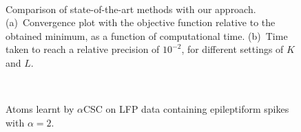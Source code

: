 \begin{figure}[t]
    \centering
      \\
    \caption[]{Comparison of state-of-the-art methods with our approach. (a)~Convergence plot with the objective function relative to the obtained minimum, as a function of computational time. (b)~Time taken to reach a relative precision of $10^{-2}$, for different settings of $K$ and $L$.  }
    \label{fig:sommaire:convergence}
\end{figure}

\begin{figure}[b]
    \centering
              \\

            \caption[]{Atoms learnt by $\alpha$CSC on LFP data containing epileptiform spikes with $\alpha=2$.}
\end{figure}


